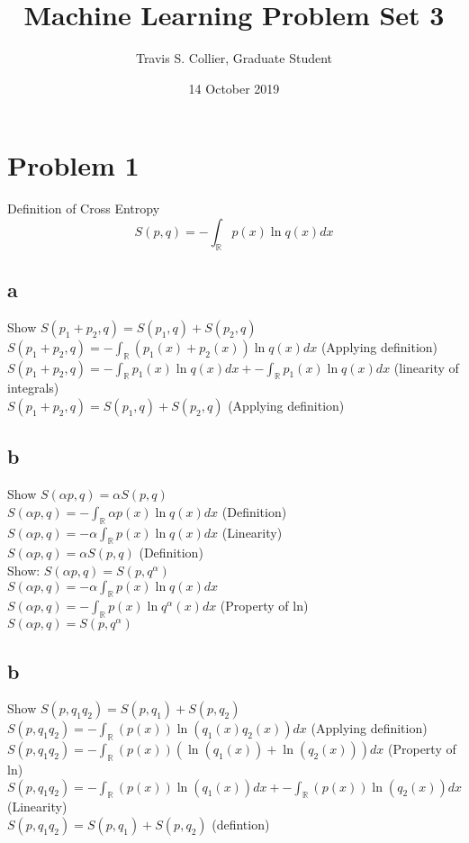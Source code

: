 \documentclass[a4paper,12pt]{article}
\begin{document}
\title{Machine Learning Problem Set 3}
\author{Travis S. Collier, Graduate Student}
\date{14 October 2019}
\maketitle

\section{Problem 1}
Definition of Cross Entropy
\begin{equation}
S(p,q) = -\int_{\mathbb{R}}p(x)\ln q(x)dx
\end{equation}
\subsection{a}
Show $S(p_1+p_2,q) = S(p_1,q)+S(p_2,q)$\\
$S(p_1+p_2,q) = -\int_{\mathbb{R}}(p_1(x) + p_2(x))\ln q(x)dx$ (Applying definition)\\
$S(p_1+p_2,q) = -\int_{\mathbb{R}}p_1(x)\ln q(x)dx + -\int_{\mathbb{R}}p_1(x)\ln q(x)dx$ (linearity of integrals)\\
$S(p_1+p_2,q) =  S(p_1,q)+S(p_2,q)$ (Applying definition)\\
\subsection{b}
Show $S(\alpha p,q) = \alpha S(p,q)$\\
$S(\alpha p,q) = -\int_{\mathbb{R}}\alpha p(x)\ln q(x)dx$ (Definition)\\
$S(\alpha p,q) = -\alpha\int_{\mathbb{R}}p(x)\ln q(x)dx$ (Linearity)\\
$S(\alpha p,q) = \alpha S(p,q)$ (Definition)\\
Show: $S(\alpha p,q) = S(p,q^{\alpha})$\\
$S(\alpha p,q) = -\alpha\int_{\mathbb{R}}p(x)\ln q(x)dx$\\
$S(\alpha p,q) = -\int_{\mathbb{R}}p(x)\ln q^{\alpha}(x)dx$ (Property of ln)\\
$S(\alpha p,q) = S(p,q^{\alpha})$\\
\subsection{b}
Show $S(p,q_1q_2) = S(p,q_1)+S(p,q_2)$\\
$S(p,q_1q_2) = -\int_{\mathbb{R}}(p(x))\ln(q_1(x)q_2(x))dx$ (Applying definition)\\
$S(p,q_1q_2) = -\int_{\mathbb{R}}(p(x))(\ln(q_1(x)) + \ln(q_2(x)))dx$ (Property of ln)\\
$S(p,q_1q_2) = -\int_{\mathbb{R}}(p(x))\ln(q_1(x))dx +  -\int_{\mathbb{R}}(p(x))\ln(q_2(x))dx$ (Linearity)\\
$S(p,q_1q_2) = S(p,q_1)+S(p,q_2)$ (defintion)\\
\end{document}

